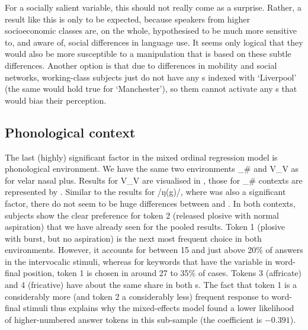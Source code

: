 For a socially salient variable, this should not really come as a surprise.
Rather, a result like this is only to be expected, because speakers from higher socioeconomic classes are, on the whole, hypothesised to be much more sensitive to, and aware of, social differences in language use.
It seems only logical that they would also be more susceptible to a manipulation that is based on these subtle differences.
Another option is that due to differences in mobility and social networks, working-class subjects just do not have any s indexed with `Liverpool' (the same would hold true for `Manchester'), so  them cannot activate any s that would bias their perception.

\subsection{Phonological context}
\label{sec.perc_res.k.phon}

The last (highly) significant factor in the mixed ordinal regression model is phonological environment.
We have the same two environments \_\# and V\_V as for velar nasal plus.
Results for V\_V are visualised in , those for \_\# contexts are represented by .
Similar to the results for /ŋ(g)/, where  was also a significant factor, there do not seem to be huge differences between  and .
In both contexts, subjects show the clear preference for token 2 (released plosive with normal aspiration) that we have already seen for the pooled results.
Token 1 (plosive with burst, but no aspiration) is the next most frequent choice in both environments.
However, it accounts for between 15 and just above 20\% of answers in the intervocalic stimuli, whereas for keywords that have the variable in word-final position, token 1 is chosen in around 27 to 35\% of cases.
Tokens 3 (affricate) and 4 (fricative) have about the same share in both s.
The fact that token 1 is a considerably more (and token 2 a considerably less) frequent response to word-final stimuli thus explains why the mixed-effects model found a lower likelihood of higher-numbered answer tokens in this sub-sample (the coefficient is \ensuremath{-0.391}).

